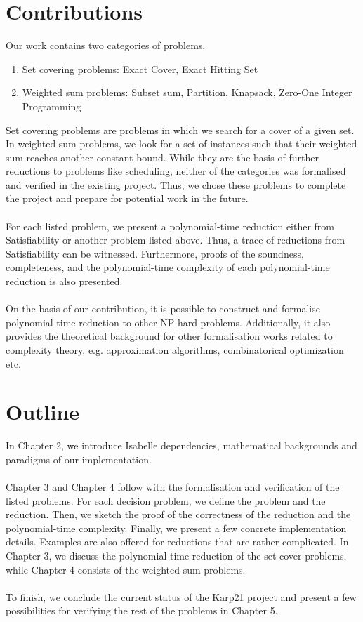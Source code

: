 \section{Contributions}
Our work contains two categories of problems. 
\begin{enumerate}
    \item Set covering problems: Exact Cover, Exact Hitting Set
    \item Weighted sum problems: Subset sum, Partition, Knapsack, Zero-One Integer Programming
\end{enumerate}
Set covering problems are problems in which we search for a cover of a given set. In weighted sum problems, 
we look for a set of instances such that their weighted sum reaches another constant bound. While they are the basis of further reductions to problems like 
scheduling, neither of the categories was formalised and verified in the existing project. 
Thus, we chose these problems to complete the project and prepare for potential work in the future.\\\\ 
For each listed problem, we present a polynomial-time reduction either from Satisfiability or another problem listed above. 
Thus, a trace of reductions from Satisfiability can be witnessed. 
Furthermore, proofs of the soundness, completeness, 
and the polynomial-time complexity of each polynomial-time reduction is also presented. \\\\
On the basis of our contribution, it is possible to construct and formalise polynomial-time reduction to other NP-hard problems. 
Additionally, it also provides the theoretical background for other formalisation works related to complexity theory, e.g. 
approximation algorithms, combinatorical optimization etc. 

\section{Outline}
In Chapter 2, we introduce Isabelle dependencies, mathematical backgrounds and paradigms of our implementation.\\\\
Chapter 3 and Chapter 4 follow with the formalisation and verification of the listed problems. For each decision problem, 
we define the problem and the reduction. Then, we sketch the proof of the correctness of the reduction and the polynomial-time complexity.
Finally, we present a few concrete implementation details. Examples are also offered for reductions that are rather complicated. 
In Chapter 3, we discuss the polynomial-time reduction of the set cover problems, while Chapter 4 consists of the weighted sum problems. \\\\
To finish, we conclude the current status of the Karp21 project
and present a few possibilities for verifying the rest of the problems in Chapter 5.
